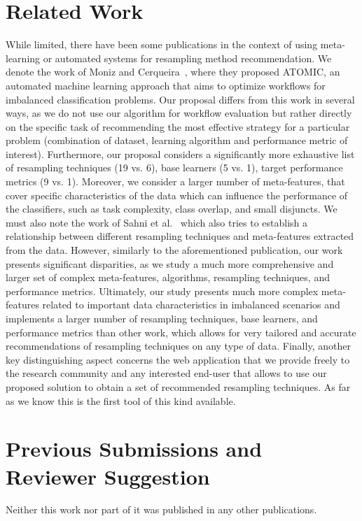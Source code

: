 \documentclass[a4paper]{article}
\begin{document}
\section{Related Work}
While limited, there have been some publications in the context of using meta-learning or automated systems for resampling method recommendation. We denote the work of Moniz and Cerqueira~\cite{moniz2021automated}, where they proposed ATOMIC, an automated machine learning approach that aims to optimize workflows for imbalanced classification problems. Our proposal differs from this work in several ways, as we do not use our algorithm for workflow evaluation but rather directly on the specific task of recommending the most effective strategy for a particular problem (combination of dataset, learning algorithm and performance metric of interest). Furthermore, our proposal considers a significantly more exhaustive list of resampling techniques (19 vs. 6), base learners (5 vs. 1), target performance metrics (9 vs. 1). Moreover, we consider a larger number of meta-features, that cover specific characteristics of the data which can influence the performance of the classifiers, such as task complexity, class overlap, and small disjuncts. We must also note the work of Sahni et al.~\cite{sahni2021aided} which also tries to establish a relationship between different resampling techniques and meta-features extracted from the data. However, similarly to the aforementioned publication, our work presents significant disparities, as we study a much more comprehensive and larger set of complex meta-features, algorithms, resampling techniques, and performance metrics. Ultimately, our study presents much more complex meta-features related to important data characteristics in imbalanced scenarios and implements a larger number of resampling techniques, base learners, and performance metrics than other work, which allows for very tailored and accurate recommendations of resampling techniques on any type of data. Finally, another key distinguishing aspect concerns the web application that we provide freely to the research community and any interested end-user that allows to use our proposed solution to obtain a set of recommended resampling techniques. As far as we know this is the first tool of this kind available.

\section{Previous Submissions and Reviewer Suggestion}
Neither this work nor part of it was published in any other publications.

  


\end{document}
